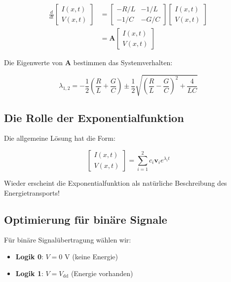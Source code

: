 ﻿\documentclass[12pt,a4paper]{article}
\theoremstyle{definition}
\theoremstyle{remark}
\begin{document}
\begin{align}
\frac{d}{dt}\begin{bmatrix} I(x,t) \\ V(x,t) \end{bmatrix} &= \begin{bmatrix} -R/L & -1/L \\ -1/C & -G/C \end{bmatrix} \begin{bmatrix} I(x,t) \\ V(x,t) \end{bmatrix} \\
&= \mathbf{A} \begin{bmatrix} I(x,t) \\ V(x,t) \end{bmatrix}
\end{align}

Die Eigenwerte von $\mathbf{A}$ bestimmen das Systemverhalten:

\begin{equation}
\lambda_{1,2} = -\frac{1}{2}\left(\frac{R}{L} + \frac{G}{C}\right) \pm \frac{1}{2}\sqrt{\left(\frac{R}{L} - \frac{G}{C}\right)^2 + \frac{4}{LC}}
\end{equation}

\subsection{Die Rolle der Exponentialfunktion}

Die allgemeine Lösung hat die Form:

\begin{equation}
\begin{bmatrix} I(x,t) \\ V(x,t) \end{bmatrix} = \sum_{i=1}^{2} c_i \mathbf{v}_i e^{\lambda_i t}
\end{equation}

Wieder erscheint die Exponentialfunktion als natürliche Beschreibung des Energietransports!

\subsection{Optimierung für binäre Signale}

Für binäre Signalübertragung wählen wir:

\begin{itemize}
\item \textbf{Logik 0}: $V = 0$ V (keine Energie)
\item \textbf{Logik 1}: $V = V_{\text{dd}}$ (Energie vorhanden)
\end{itemize}
\end{document}
